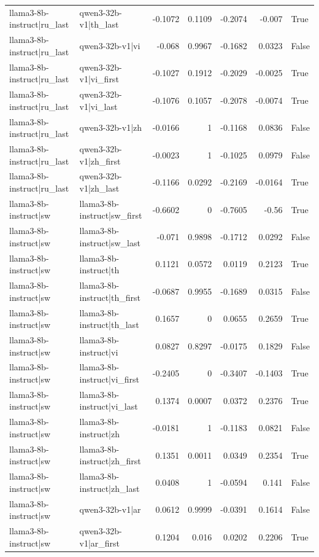 \begin{table}
\begin{tabular}{l l r r r r l}
llama3-8b-instruct|ru_last & qwen3-32b-v1|th_last & -0.1072 & 0.1109 & -0.2074 & -0.007 & True \\
llama3-8b-instruct|ru_last & qwen3-32b-v1|vi & -0.068 & 0.9967 & -0.1682 & 0.0323 & False \\
llama3-8b-instruct|ru_last & qwen3-32b-v1|vi_first & -0.1027 & 0.1912 & -0.2029 & -0.0025 & True \\
llama3-8b-instruct|ru_last & qwen3-32b-v1|vi_last & -0.1076 & 0.1057 & -0.2078 & -0.0074 & True \\
llama3-8b-instruct|ru_last & qwen3-32b-v1|zh & -0.0166 & 1 & -0.1168 & 0.0836 & False \\
llama3-8b-instruct|ru_last & qwen3-32b-v1|zh_first & -0.0023 & 1 & -0.1025 & 0.0979 & False \\
llama3-8b-instruct|ru_last & qwen3-32b-v1|zh_last & -0.1166 & 0.0292 & -0.2169 & -0.0164 & True \\
llama3-8b-instruct|sw & llama3-8b-instruct|sw_first & -0.6602 & 0 & -0.7605 & -0.56 & True \\
llama3-8b-instruct|sw & llama3-8b-instruct|sw_last & -0.071 & 0.9898 & -0.1712 & 0.0292 & False \\
llama3-8b-instruct|sw & llama3-8b-instruct|th & 0.1121 & 0.0572 & 0.0119 & 0.2123 & True \\
llama3-8b-instruct|sw & llama3-8b-instruct|th_first & -0.0687 & 0.9955 & -0.1689 & 0.0315 & False \\
llama3-8b-instruct|sw & llama3-8b-instruct|th_last & 0.1657 & 0 & 0.0655 & 0.2659 & True \\
llama3-8b-instruct|sw & llama3-8b-instruct|vi & 0.0827 & 0.8297 & -0.0175 & 0.1829 & False \\
llama3-8b-instruct|sw & llama3-8b-instruct|vi_first & -0.2405 & 0 & -0.3407 & -0.1403 & True \\
llama3-8b-instruct|sw & llama3-8b-instruct|vi_last & 0.1374 & 0.0007 & 0.0372 & 0.2376 & True \\
llama3-8b-instruct|sw & llama3-8b-instruct|zh & -0.0181 & 1 & -0.1183 & 0.0821 & False \\
llama3-8b-instruct|sw & llama3-8b-instruct|zh_first & 0.1351 & 0.0011 & 0.0349 & 0.2354 & True \\
llama3-8b-instruct|sw & llama3-8b-instruct|zh_last & 0.0408 & 1 & -0.0594 & 0.141 & False \\
llama3-8b-instruct|sw & qwen3-32b-v1|ar & 0.0612 & 0.9999 & -0.0391 & 0.1614 & False \\
llama3-8b-instruct|sw & qwen3-32b-v1|ar_first & 0.1204 & 0.016 & 0.0202 & 0.2206 & True \\

\end{tabular}
\end{table}
